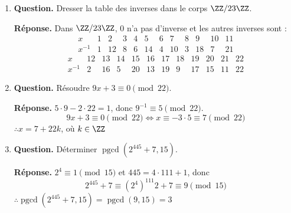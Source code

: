 \documentclass[12pt, a4paper]{article}
\begin{document}
\begin{enumerate}[label=2.\arabic*., start=17]
  \item \begin{minipage}[t]{\linewidth}\raggedright
\textbf{Question.} Dresser la table des inverses dans le corps $\ZZ/23\ZZ$.
\par\smallskip
\textbf{Réponse.} Dans $\ZZ/23\ZZ$, $0$ n'a pas d'inverse et les autres inverses sont :
    \[
      \begin{array}{c|rrrrrrrrrrr}
        x & 1 & 2 & 3 & 4 & 5 & 6 & 7 & 8 & 9 & 10 & 11\\ \hline
        x^{-1} & 1 & 12 & 8 & 6 & 14 & 4 & 10 & 3 & 18 & 7 & 21
      \end{array}
    \]
    \[
      \begin{array}{c|rrrrrrrrrrr}
        x & 12 & 13 & 14 & 15 & 16 & 17 & 18 & 19 & 20 & 21 & 22\\ \hline
        x^{-1} & 2 & 16 & 5 & 20 & 13 & 19 & 9 & 17 & 15 & 11 & 22
      \end{array}
    \]
\end{minipage}

  \item \begin{minipage}[t]{\linewidth}\raggedright
\textbf{Question.} Résoudre $9x+3\equiv0\pmod{22}$.
\par\smallskip
\textbf{Réponse.} $5 \cdot 9 - 2 \cdot 22 = 1$, donc $9^{-1} \equiv 5 \pmod{22}$.
    \[
      9x + 3 \equiv 0 \pmod{22} \iff x \equiv -3 \cdot 5 \equiv 7 \pmod{22}
    \]
    $\therefore x = 7 + 22k$, où $k \in \ZZ$
\end{minipage}

  \item \begin{minipage}[t]{\linewidth}\raggedright
\textbf{Question.} Déterminer $\operatorname{pgcd}(2^{445}+7,15)$.
\par\smallskip
\textbf{Réponse.} $2^4 \equiv 1 \pmod{15}$ et $445 = 4 \cdot 111 + 1$, donc
    \[
      2^{445} + 7 \equiv (2^4)^{111}2 + 7 \equiv 9 \pmod{15}
    \]
    $\therefore \operatorname{pgcd}(2^{445} + 7, 15) = \operatorname{pgcd}(9, 15) = 3$
\end{minipage}


\end{enumerate}
\end{document}
